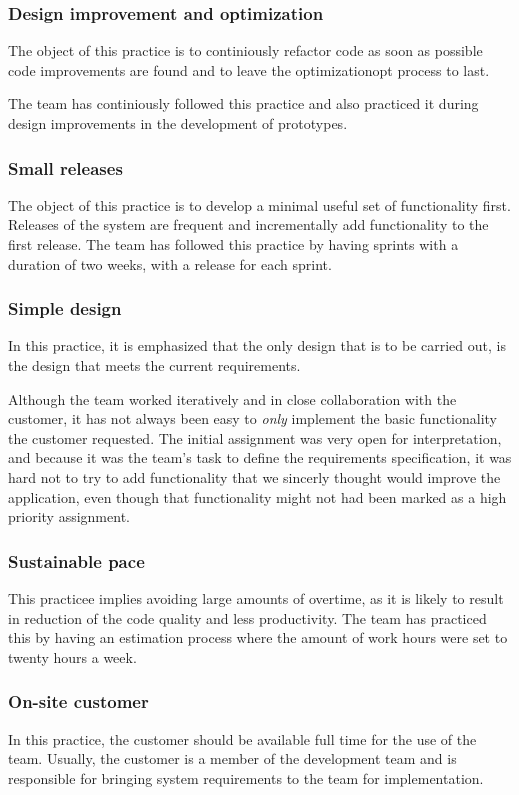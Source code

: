 \subsubsection{Design improvement and optimization}
The object of this practice is to continiously refactor code as soon as possible code improvements are found and to leave the optimization\gls{opt} process to last. 

The team has continiously followed this practice and also practiced it during design improvements in the development of prototypes.
 
\subsubsection{Small releases}
The object of this practice is to develop a minimal useful set of functionality first. Releases of the system are frequent and incrementally add functionality to the first release. The team has followed this practice by having sprints with a duration of two weeks, with a release for each sprint.


\subsubsection{Simple design}
In this practice, it is emphasized that the only design that is to be carried out, is the design that meets the current requirements.

Although the team worked iteratively and in close collaboration with the customer, it has not always been easy to \emph{only} implement the basic functionality the customer requested. The initial assignment was very open for interpretation, and because it was the team's task to define the requirements specification, it was hard not to try to add functionality that we sincerly thought would improve the application, even though that functionality might not had been marked as a high priority assignment.


\subsubsection{Sustainable pace}
This practicee implies avoiding large amounts of overtime, as it is likely to result in reduction of the code quality and less productivity. The team has practiced this by having an estimation process where the amount of work hours were set to twenty hours a week.


\subsubsection{On-site customer}
In this practice, the customer should be available full time for the use of the team. Usually, the customer is a member of the development team and is responsible for bringing system requirements to the team for implementation.

